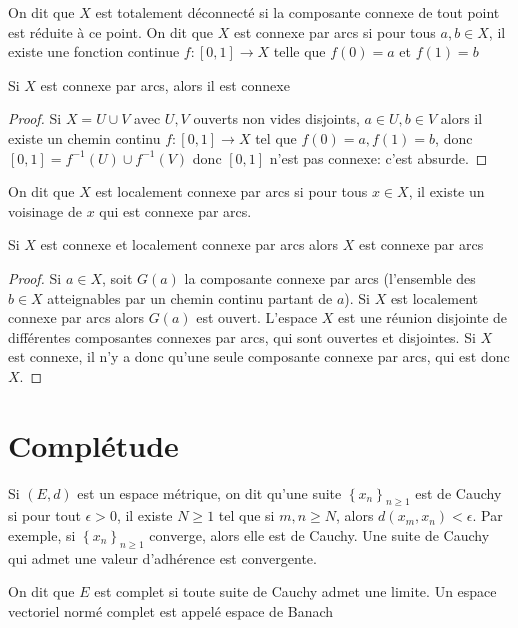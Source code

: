 \begin{dfn}
    On dit que $X$ est totalement déconnecté si la composante connexe de tout point est réduite à ce point. On dit que  $X$ est connexe par arcs si pour tous  $a,b \in  X$, il existe une fonction continue $f:[0,1]\longrightarrow X$ telle que $f(0)=a$ et  $f(1)=b$
\end{dfn}

\begin{thm}
Si $X$ est connexe par arcs, alors il est connexe
\end{thm}

\begin{proof}
    Si $X=U\cup V$ avec $U,V$ ouverts non vides disjoints,  $a \in  U, b \in  V$ alors il existe un chemin continu $f:[0,1] \longrightarrow X$ tel que $f(0)=a, f(1)=b$, donc  $[0,1]=f^{-1}(U)\cup f^{-1}(V)$ donc $[0,1]$ n'est pas connexe: c'est absurde.
\end{proof}

\begin{dfn}
    On dit que $X$ est localement connexe par arcs si pour tous  $x \in  X$, il existe un voisinage de $x$ qui est connexe par arcs.
\end{dfn}

\begin{prop}
Si $X$ est connexe et localement connexe par arcs alors  $X$ est connexe par arcs
\end{prop}

\begin{proof}
Si $a \in  X$, soit $G(a)$ la composante connexe par arcs (l'ensemble des $b \in  X$ atteignables par un chemin continu partant de $a$). Si $X$ est localement connexe par arcs alors  $G(a)$ est ouvert. L'espace  $X$ est une réunion disjointe de différentes composantes connexes par arcs, qui sont ouvertes et disjointes. Si  $X$ est connexe, il n'y a donc qu'une seule composante connexe par arcs, qui est donc  $X$.
\end{proof}

\section{Complétude}

\begin{dfn}[Complétude]
    Si $(E, d)$ est un espace métrique, on dit qu'une suite $\left\{x_{n}\right\}_{n \geq 1}$ est de Cauchy si pour tout $\epsilon>0$, il existe $N \geq 1$ tel que si $m, n \geq N$, alors $d\left(x_{m}, x_{n}\right)<\epsilon$. Par exemple, si $\left\{x_{n}\right\}_{n \geq 1}$ converge, alors elle est de Cauchy. Une suite de Cauchy qui admet une valeur d'adhérence est convergente.

    On dit que $E$ est complet si toute suite de Cauchy admet une limite. 
    Un espace vectoriel normé complet est appelé espace de Banach
\end{dfn}

